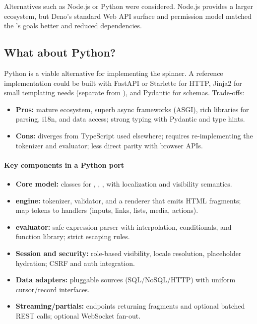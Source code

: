 Alternatives such as Node.js or Python were considered. Node.js provides a larger ecosystem, but Deno’s standard Web API surface and permission model matched the \webspinner’s goals better and reduced dependencies.

\subsection{What about Python?}
Python is a viable alternative for implementing the spinner. A reference implementation could be built with FastAPI or Starlette for HTTP, Jinja2 for small templating needs (separate from \wbll), and Pydantic for schemas. Trade-offs:
\begin{itemize}
	\item \textbf{Pros:} mature ecosystem, superb async frameworks (ASGI), rich libraries for parsing, i18n, and data access; strong typing with Pydantic and type hints.
	\item \textbf{Cons:} diverges from TypeScript used elsewhere; requires re-implementing the \wbll tokenizer and \wbpl evaluator; less direct parity with browser APIs.
\end{itemize}

\paragraph{Key components in a Python port}
\begin{itemize}
	\item \textbf{Core model:} classes for \stwsitedash, \stwarea, \stwpage, \stwcontent with localization and visibility semantics.
	\item \textbf{\wbll engine:} tokenizer, validator, and a renderer that emits HTML fragments; map tokens to handlers (inputs, links, lists, media, actions).
	\item \textbf{\wbpl evaluator:} safe expression parser with interpolation, conditionals, and function library; strict escaping rules.
	\item \textbf{Session and security:} role-based visibility, locale resolution, placeholder hydration; CSRF and auth integration.
	\item \textbf{Data adapters:} pluggable sources (SQL/NoSQL/HTTP) with uniform cursor/record interfaces.
	\item \textbf{Streaming/partials:} endpoints returning fragments and optional batched REST calls; optional WebSocket fan-out.
\end{itemize}

